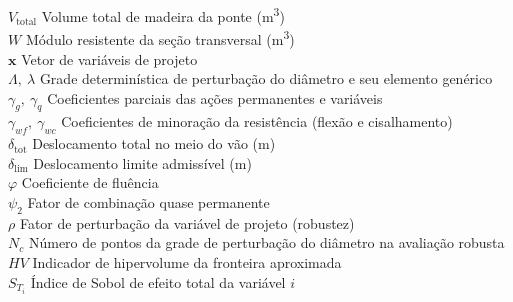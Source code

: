 \begin{tabbing}
$V_{\mathrm{total}}$ \> Volume total de madeira da ponte (m\textsuperscript{3})\\
$W$ \> Módulo resistente da seção transversal (m\textsuperscript{3})\\
$\mathbf{x}$ \> Vetor de variáveis de projeto\\
$\Lambda,\ \lambda$ \> Grade determinística de perturbação do diâmetro e seu elemento genérico\\
$\gamma_g,\ \gamma_q$ \> Coeficientes parciais das ações permanentes e variáveis\\
$\gamma_{wf},\ \gamma_{wc}$ \> Coeficientes de minoração da resistência (flexão e cisalhamento)\\
$\delta_{\mathrm{tot}}$ \> Deslocamento total no meio do vão (m)\\
$\delta_{\mathrm{lim}}$ \> Deslocamento limite admissível (m)\\
$\varphi$ \> Coeficiente de fluência\\
$\psi_2$ \> Fator de combinação quase permanente\\
$\rho$ \> Fator de perturbação da variável de projeto (robustez)\\
$N_c$ \> Número de pontos da grade de perturbação do diâmetro na avaliação robusta\\
$HV$ \> Indicador de hipervolume da fronteira aproximada\\
$S_{T_i}$ \> Índice de Sobol de efeito total da variável $i$
\end{tabbing}
